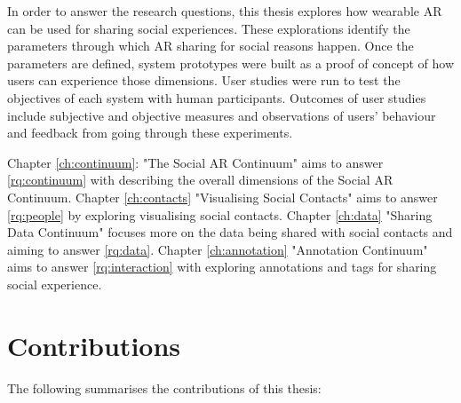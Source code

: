 In order to answer the research questions, this thesis explores how wearable AR can be used for sharing social experiences. These explorations identify the parameters through which AR sharing for social reasons happen. Once the parameters are defined, system prototypes were built as a proof of concept of how users can experience those dimensions. User studies were run to test the objectives of each system with human participants. Outcomes of user studies include subjective and objective measures and observations of users' behaviour and feedback from going through these experiments. 

Chapter \ref{ch:continuum}: "The Social AR Continuum" aims to answer \ref{rq:continuum} with describing the overall dimensions of the Social AR Continuum. 
Chapter \ref{ch:contacts} "Visualising Social Contacts" aims to answer \ref{rq:people} by exploring visualising social contacts. 
Chapter \ref{ch:data} "Sharing Data Continuum" focuses more on the data being shared with social contacts and aiming to answer \ref{rq:data}.
Chapter \ref{ch:annotation} "Annotation Continuum" aims to answer \ref{rq:interaction} with exploring annotations and tags for sharing social experience. 

\section{Contributions}

The following summarises the contributions of this thesis: 

